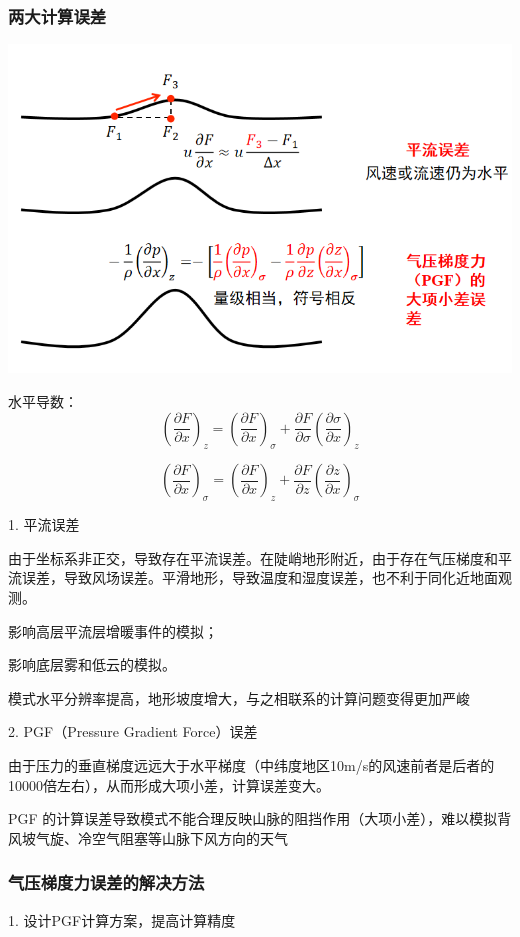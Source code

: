 \documentclass{article}
\begin{document}
\subsubsection{两大计算误差}
\begin{center}
        \includegraphics[width=0.8\linewidth]{Fig4_1.png}
\end{center}

水平导数：
$$(\frac{\partial F}{\partial x})_z = (\frac{\partial F}{\partial x})_{\sigma} + \frac{\partial F}{\partial \sigma}(\frac{\partial \sigma}{\partial x})_z $$

$$(\frac{\partial F}{\partial x})_\sigma = (\frac{\partial F}{\partial x})_z + \frac{\partial F}{\partial z}(\frac{\partial z}{\partial x})_\sigma$$

1. 平流误差

由于坐标系非正交，导致存在平流误差。在陡峭地形附近，由于存在气压梯度和平流误差，导致风场误差。平滑地形，导致温度和湿度误差，也不利于同化近地面观测。

影响高层平流层增暖事件的模拟；

影响底层雾和低云的模拟。

模式水平分辨率提高，地形坡度增大，与之相联系的计算问题变得更加严峻

2. PGF（Pressure Gradient Force）误差

由于压力的垂直梯度远远大于水平梯度（中纬度地区10m/s的风速前者是后者的10000倍左右），从而形成大项小差，计算误差变大。

PGF 的计算误差导致模式不能合理反映山脉的阻挡作用（大项小差），难以模拟背风坡气旋、冷空气阻塞等山脉下风方向的天气

\subsubsection{气压梯度力误差的解决方法}
1. 设计PGF计算方案，提高计算精度
\end{document}
